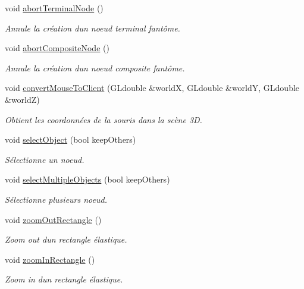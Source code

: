 \begin{DoxyCompactItemize}
void \hyperlink{group__inf2990_gaf1099ad811d94b7ede2572fbd3c7c89e}{abort\+Terminal\+Node} ()
\begin{DoxyCompactList}\small\item\em Annule la création d\textquotesingle{}un noeud terminal fantôme. \end{DoxyCompactList}\item 
\hypertarget{group__inf2990_gaf17fbb34428b0e0a22ffcdc245e52d19}{}void \hyperlink{group__inf2990_gaf17fbb34428b0e0a22ffcdc245e52d19}{abort\+Composite\+Node} ()\label{group__inf2990_gaf17fbb34428b0e0a22ffcdc245e52d19}

\begin{DoxyCompactList}\small\item\em Annule la création d\textquotesingle{}un noeud composite fantôme. \end{DoxyCompactList}\item 
void \hyperlink{group__inf2990_ga8ddf1db58d72a811ce50cb830b0fa1c5}{convert\+Mouse\+To\+Client} (G\+Ldouble \&world\+X, G\+Ldouble \&world\+Y, G\+Ldouble \&world\+Z)
\begin{DoxyCompactList}\small\item\em Obtient les coordonnées de la souris dans la scène 3\+D. \end{DoxyCompactList}\item 
void \hyperlink{group__inf2990_gaa1eea4eb52c6ec22980e0b21e2bdbcd4}{select\+Object} (bool keep\+Others)
\begin{DoxyCompactList}\small\item\em Sélectionne un noeud. \end{DoxyCompactList}\item 
void \hyperlink{group__inf2990_ga7cbdab19081ab5e385cff2862e0642cd}{select\+Multiple\+Objects} (bool keep\+Others)
\begin{DoxyCompactList}\small\item\em Sélectionne plusieurs noeud. \end{DoxyCompactList}\item 
void \hyperlink{group__inf2990_ga9b2a60b7b9392f6284e2fb7560e9c7f8}{zoom\+Out\+Rectangle} ()
\begin{DoxyCompactList}\small\item\em Zoom out d\textquotesingle{}un rectangle élastique. \end{DoxyCompactList}\item 
void \hyperlink{group__inf2990_ga10c88f159ad8d8ff9b17927d7ca50a0e}{zoom\+In\+Rectangle} ()
\begin{DoxyCompactList}\small\item\em Zoom in d\textquotesingle{}un rectangle élastique. \end{DoxyCompactList}\end{DoxyCompactItemize}
